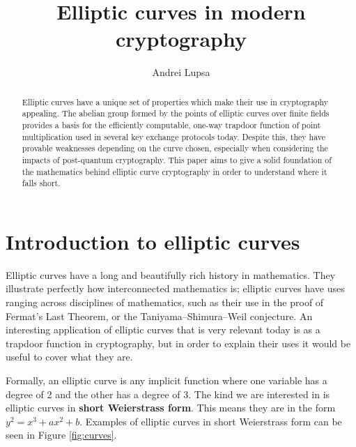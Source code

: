 \documentclass[a4paper]{article}
\title{Elliptic curves in modern cryptography}
\author{Andrei Lupsa}
\begin{document}
\maketitle

\begin{abstract}
Elliptic curves have a unique set of properties which make their use in cryptography appealing. The abelian group formed by the points of elliptic curves over finite fields provides a basis for the efficiently computable, one-way trapdoor function of point multiplication used in several key exchange protocols today. Despite this, they have provable weaknesses depending on the curve chosen, especially when considering the impacts of post-quantum cryptography. This paper aims to give a solid foundation of the mathematics behind elliptic curve cryptography in order to understand where it falls short.
\end{abstract}


\section{Introduction to elliptic curves}\label{intro}

Elliptic curves have a long and beautifully rich history in mathematics. They illustrate perfectly how interconnected mathematics is; elliptic curves have uses ranging across disciplines of mathematics, such as their use in the proof of Fermat's Last Theorem, or the Taniyama–Shimura–Weil conjecture. An interesting application of elliptic curves that is very relevant today is as a trapdoor function in cryptography, but in order to explain their uses it would be useful to cover what they are.

Formally, an elliptic curve is any implicit function where one variable has a degree of 2 and the other has a degree of 3. The kind we are interested in is elliptic curves in \textbf{short Weierstrass form}. This means they are in the form $y^2 = x^3 + ax^2 + b$. Examples of elliptic curves in short Weierstrass form can be seen in Figure \ref{fig:curves}.\cite{guide}
\end{document}
